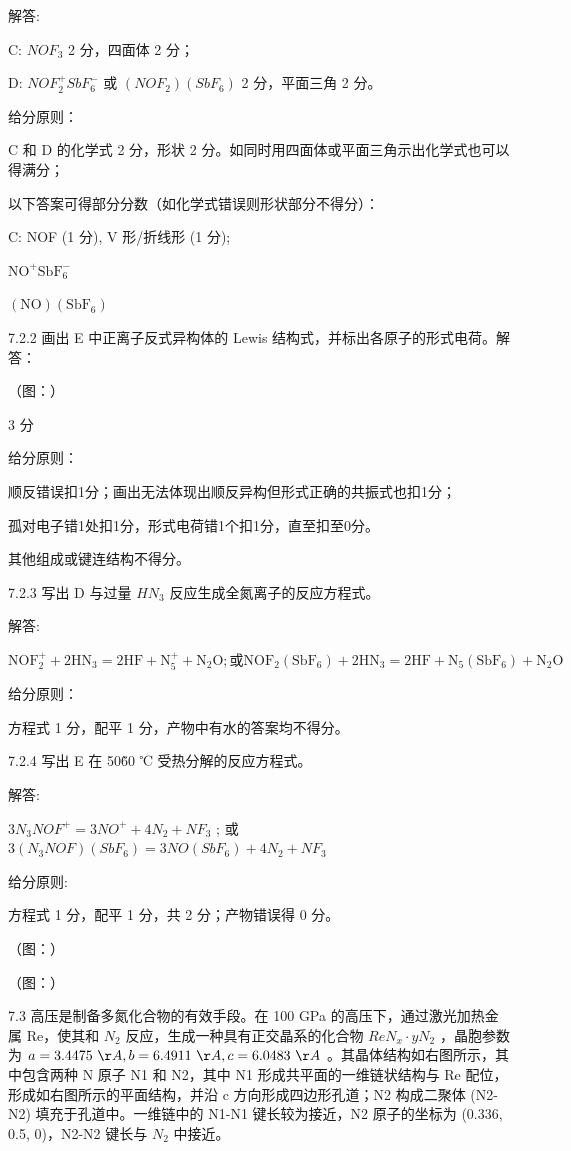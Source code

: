 解答:

C: $NOF_{3}$ 2 分，四面体 2 分；

D: $NOF_{2}^{+}SbF_{6}^{-}$ 或 $(NOF_{2})(SbF_{6})$ 2 分，平面三角 2 分。

给分原则：

C 和 D 的化学式 2 分，形状 2 分。如同时用四面体或平面三角示出化学式也可以得满分；

以下答案可得部分分数（如化学式错误则形状部分不得分）：

C: NOF (1 分), V 形/折线形 (1 分);

$
\mathrm{NO} ^ {+} \mathrm{SbF} _ {6} ^ {-}
$

$
(\mathrm{NO}) (\mathrm{SbF} _ {6})
$

7.2.2 画出 E 中正离子反式异构体的 Lewis 结构式，并标出各原子的形式电荷。解答：

（图：）

3 分

给分原则：

\- 顺反错误扣1分；画出无法体现出顺反异构但形式正确的共振式也扣1分；

\- 孤对电子错1处扣1分，形式电荷错1个扣1分，直至扣至0分。

\- 其他组成或键连结构不得分。

7.2.3 写出 D 与过量 $HN_{3}$ 反应生成全氮离子的反应方程式。

解答:

$
\mathrm{NOF} _ {2} ^ {+} + 2 \mathrm{HN} _ {3} = 2 \mathrm{HF} + \mathrm{N} _ {5} ^ {+} + \mathrm{N} _ {2} \mathrm{O}; \text {或} \mathrm{NOF} _ {2} (\mathrm{SbF} _ {6}) + 2 \mathrm{HN} _ {3} = 2 \mathrm{HF} + \mathrm{N} _ {5} (\mathrm{SbF} _ {6}) + \mathrm{N} _ {2} \mathrm{O}
$

给分原则：

方程式 1 分，配平 1 分，产物中有水的答案均不得分。

7.2.4 写出 E 在 50\~60 ℃ 受热分解的反应方程式。

解答:

$3N_{3}NOF^{+}=3NO^{+}+4N_{2}+NF_{3}$ ; 或 $3(N_{3}NOF)(SbF_{6})=3NO(SbF_{6})+4N_{2}+NF_{3}$

给分原则:

方程式 1 分，配平 1 分，共 2 分；产物错误得 0 分。

（图：）

（图：）

7.3 高压是制备多氮化合物的有效手段。在 100 GPa 的高压下，通过激光加热金属 Re，使其和 $N_{2}$ 反应，生成一种具有正交晶系的化合物 $ReN_{x}\cdot yN_{2}$ ，晶胞参数为 $a=3.4475\ \AA, b=6.4911\ \AA, c=6.0483\ \AA$ 。其晶体结构如右图所示，其中包含两种 N 原子 N1 和 N2，其中 N1 形成共平面的一维链状结构与 Re 配位，形成如右图所示的平面结构，并沿 c 方向形成四边形孔道；N2 构成二聚体 (N2-N2) 填充于孔道中。一维链中的 N1-N1 键长较为接近，N2 原子的坐标为 (0.336, 0.5, 0)，N2-N2 键长与 $N_{2}$ 中接近。

